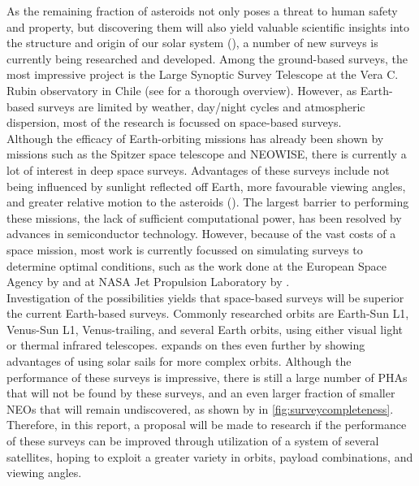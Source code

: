 \documentclass[12pt, english, NoHyper]{AE4010-template}
\begin{document}
As the remaining fraction of asteroids not only poses a threat to human safety and property, but discovering them will also yield valuable scientific insights into the structure and origin of our solar system (\cite{Populations}), a number of new surveys is currently being researched and developed. Among the ground-based surveys, the most impressive project is the Large Synoptic Survey Telescope at the Vera C. Rubin observatory in Chile (see \cite{LSST} for a thorough overview). However, as Earth-based surveys are limited by weather, day/night cycles and atmospheric dispersion, most of the research is focussed on space-based surveys. \\

Although the efficacy of Earth-orbiting missions has already been shown by missions such as the Spitzer space telescope and NEOWISE, there is currently a lot of interest in deep space surveys. Advantages of these surveys include not being influenced by sunlight reflected off Earth, more favourable viewing angles, and greater relative motion to the asteroids (\cite{NEOSDT1}). The largest barrier to performing these missions, the lack of sufficient computational power, has been resolved by advances in semiconductor technology. However, because of the vast costs of a space mission, most work is currently focussed on simulating surveys to determine optimal conditions, such as the work done at the European Space Agency by \cite{Flyeye} and at NASA Jet Propulsion Laboratory by \cite{NEOSDT2}. \\

Investigation of the possibilities yields that space-based surveys will be superior the current Earth-based surveys. Commonly researched orbits are Earth-Sun L1, Venus-Sun L1, Venus-trailing, and several Earth orbits, using either visual light or thermal infrared telescopes. \cite{ThesisOlga} expands on thes even further by showing advantages of using solar sails for more complex orbits. Although the performance of these surveys is impressive, there is still a large number of PHAs that will not be found by these surveys, and an even larger fraction of smaller NEOs that will remain undiscovered, as shown by \cite{NEOSDT2} in \autoref{fig:surveycompleteness}. Therefore, in this report, a proposal will be made to research if the performance of these surveys can be improved through utilization of a system of several satellites, hoping to exploit a greater variety in orbits, payload combinations, and viewing angles.
\end{document}
